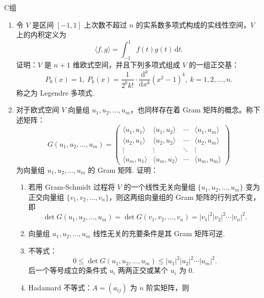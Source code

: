 \centerline{\heiti C组}
\begin{enumerate}
    \item 令 $V$ 是区间 $[-1, 1]$ 上次数不超过 $n$ 的实系数多项式构成的实线性空间，$V$ 上的内积定义为
            \[
                \langle f, g \rangle = \int_{-1}^{1} f(t)g(t)\,\mathrm{d}t.
            \]
            证明：$V$ 是 $n + 1$ 维欧式空间，并且下列多项式组成 $V$ 的一组正交基：
            \[
                P_0(x) = 1, \ P_k(x) = \dfrac{1}{2^k k!} \cdot \dfrac{\mathrm{d}^k}{\mathrm{d}x^k} (x^2 - 1)^k, \ k = 1, 2, \ldots, n.
            \]
            称之为 Legendre 多项式.
    \item 对于欧式空间 $V$ 向量组 $u_1, u_2, \ldots, u_m$，也同样存在着 Gram 矩阵的概念。称下述矩阵：
            \[
                G(u_1, u_2, \ldots, u_m) = \begin{pmatrix}
                    \langle u_1, u_1 \rangle & \langle u_1, u_2 \rangle & \cdots & \langle u_1, u_m \rangle \\
                    \langle u_2, u_1 \rangle & \langle u_2, u_2 \rangle & \cdots & \langle u_2, u_m \rangle \\
                    \vdots                   & \vdots                   & \ddots & \vdots                   \\
                    \langle u_m, u_1 \rangle & \langle u_m, u_2 \rangle & \cdots & \langle u_m, u_m \rangle
                \end{pmatrix}
            \]
            为向量组 $u_1, u_2, \ldots, u_m$ 的 Gram 矩阵. 证明：
            \begin{enumerate}
                \item 若用 Gram-Schmidt 过程将 $ V $ 的一个线性无关向量组 $\{u_1, u_2, \ldots, u_m\}$ 变为正交向量组 $\{v_1, v_2, \ldots, v_n\}$，则这两组向量组的 Gram 矩阵的行列式不变，即
                    \[
                        \det G(u_1, u_2, \ldots, u_m) = \det G(v_1, v_2, \ldots, v_n) = \lvert v_1 \rvert^2 \lvert v_2 \rvert^2 \cdots \lvert v_n \rvert^2.
                    \]
                \item 向量组 $u_1, u_2, \ldots, u_m$ 线性无关的充要条件是其 Gram 矩阵可逆.
                \item 不等式：
                        \[
                            0 \leqslant \det G(u_1, u_2, \ldots, u_m) \leqslant \lvert u_1 \rvert^2 \lvert u_2 \rvert^2 \cdots \lvert u_m \rvert^2.
                        \]
                        后一个等号成立的条件式 $u_i$ 两两正交或某个 $u_i$ 为 0.
                \item Hadamard 不等式：$A = (a_{ij})$ 为 $n$ 阶实矩阵，则

\end{enumerate}
\end{enumerate}
